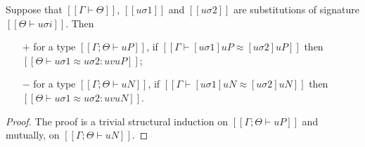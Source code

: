 \begin{lemma}
  \label{lemma:subst-equiv-metavar}
  Suppose that $[[Γ ⊢ Θ]]$, $[[uσ1]]$ and $[[uσ2]]$ are substitutions 
  of signature $[[Θ ⊢ uσi]]$.
  Then 
  \begin{enumerate}
    \item [$+$] for a type $[[Γ; Θ ⊢ uP]]$, if $[[Γ ⊢ [uσ1]uP ≈ [uσ2]uP]]$ then
      $[[Θ ⊢ uσ1 ≈ uσ2 : uv uP]]$;
    \item [$-$] for a type $[[Γ; Θ ⊢ uN]]$, if $[[Γ ⊢ [uσ1]uN ≈ [uσ2]uN]]$ then
      $[[Θ ⊢ uσ1 ≈ uσ2 : uv uN]]$.
  \end{enumerate}
\end{lemma}
\begin{proof}
  The proof is a trivial structural induction on 
  $[[Γ; Θ ⊢ uP]]$ and mutually, on $[[Γ; Θ ⊢ uN]]$.
\end{proof}